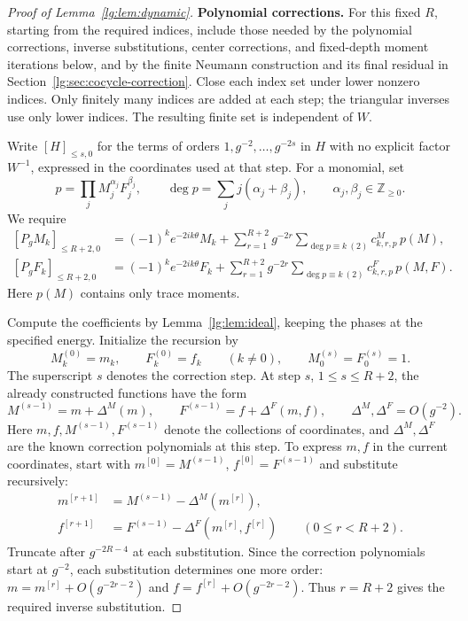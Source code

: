 \documentclass[11pt]{article}
\numberwithin{equation}{section}
\theoremstyle{remark}
\begin{document}
\begin{proof}[Proof of Lemma~\ref{lg:lem:dynamic}]
\noindent\textbf{Polynomial corrections.}
For this fixed $R$, starting from the required indices,
include those needed by the polynomial corrections, inverse
substitutions, center corrections, and fixed-depth moment iterations
below, and by the finite Neumann construction and its final residual
in Section~\ref{lg:sec:cocycle-correction}.
Close each index set under lower nonzero indices. Only finitely many
indices are added at each step; the triangular inverses use only lower
indices. The resulting finite set is independent of $W$.

Write $[H]_{\le s,0}$
for the terms of orders $1,g^{-2},\ldots,g^{-2s}$ in $H$ with no
explicit factor $W^{-1}$, expressed in the coordinates used at that
step. For a monomial, set
\[
 p=\prod_j M_j^{\alpha_j}F_j^{\beta_j},\qquad
 \deg p=\sum_j j(\alpha_j+\beta_j),\qquad
 \alpha_j,\beta_j\in\mathbb Z_{\ge0}.
\]
We require
\begin{equation}\label{lg:eq:required-parity-updates}
 \begin{aligned}
 [P_gM_k]_{\le R+2,0}
 &=(-1)^ke^{-2ik\theta}M_k
   +\sum_{r=1}^{R+2}g^{-2r}
     \sum_{\deg p\equiv k\ (2)}c^M_{k,r,p}\,p(M),\\
 [P_gF_k]_{\le R+2,0}
 &=(-1)^ke^{-2ik\theta}F_k
   +\sum_{r=1}^{R+2}g^{-2r}
     \sum_{\deg p\equiv k\ (2)}c^F_{k,r,p}\,p(M,F).
 \end{aligned}
\end{equation}
Here $p(M)$ contains only trace moments.

Compute the coefficients by Lemma~\ref{lg:lem:ideal}, keeping the
phases at the specified energy. Initialize the recursion by
\[
 M_k^{(0)}=m_k,\qquad F_k^{(0)}=f_k\qquad(k\ne0),
 \qquad M_0^{(s)}=F_0^{(s)}=1.
\]
The superscript $s$ denotes the correction step.
At step $s$, $1\le s\le R+2$, the already constructed functions have
the form
\[
 M^{(s-1)}=m+\Delta^M(m),\qquad
 F^{(s-1)}=f+\Delta^F(m,f),\qquad
 \Delta^M,\Delta^F=O(g^{-2}).
\]
Here $m,f,M^{(s-1)},F^{(s-1)}$ denote the collections of coordinates,
and $\Delta^M,\Delta^F$ are the known correction polynomials at this
step. To express $m,f$ in the current coordinates, start with
$m^{[0]}=M^{(s-1)}$, $f^{[0]}=F^{(s-1)}$ and substitute recursively:
\begin{equation}\label{lg:eq:coordinate-reversion}
 \begin{aligned}
 m^{[r+1]}&=M^{(s-1)}-\Delta^M(m^{[r]}),\\
 f^{[r+1]}&=F^{(s-1)}-\Delta^F(m^{[r]},f^{[r]})
 \qquad(0\le r<R+2).
 \end{aligned}
\end{equation}
Truncate after $g^{-2R-4}$ at each substitution. Since the correction
polynomials start at $g^{-2}$, each substitution determines one more
order: $m=m^{[r]}+O(g^{-2r-2})$ and
$f=f^{[r]}+O(g^{-2r-2})$. Thus $r=R+2$ gives the required inverse substitution.


\end{proof}
\end{document}
